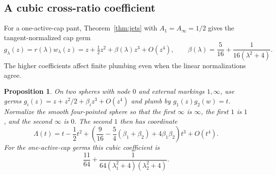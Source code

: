 \documentclass[11pt,a4paper]{article}
\newtheorem{proposition}[theorem]{Proposition}
\theoremstyle{definition}
\begin{document}
\subsection{A cubic cross-ratio coefficient}
For a one-active-cap pant, Theorem~\ref{thm:jets} with $A_1=A_\infty=1/2$ gives the tangent-normalized cap germ
\[
 g_\lambda(z)=r(\lambda)w_\lambda(z)
 =z+\tfrac12z^2+\beta(\lambda)z^3+O(z^4),\qquad
 \beta(\lambda)=\frac5{16}+\frac1{16(\lambda^2+4)}.
\]
The higher coefficients affect finite plumbing even when the linear normalizations agree.

\begin{proposition}\label{prop:plumbing-jet}
On two spheres with node $0$ and external markings $1,\infty$, use germs
$g_i(z)=z+z^2/2+\beta_i z^3+O(z^4)$ and plumb by $g_1(z)g_2(w)=t$.
Normalize the smooth four-pointed sphere so that the first $\infty$ is $\infty$, the first $1$ is $1$, and the second $\infty$ is $0$. The second $1$ then has coordinate
\[
 \Lambda(t)=t-\frac12t^2+
 \left(\frac9{16}-\frac54(\beta_1+\beta_2)+4\beta_1\beta_2\right)t^3
 +O(t^4).
\]
For the one-active-cap germs this cubic coefficient is
\[
 \frac{11}{64}+\frac1{64(\lambda_1^2+4)(\lambda_2^2+4)}.
\]
\end{proposition}
\end{document}
